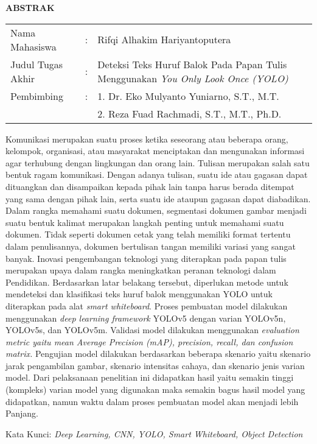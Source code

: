 \begin{center}
  \large\textbf{ABSTRAK}
\end{center}


\vspace{2ex}

\begingroup
  \setlength{\tabcolsep}{0pt}

  \noindent
  \begin{tabularx}{\textwidth}{l >{\centering}m{2em} X}
    Nama Mahasiswa    &:& Rifqi Alhakim Hariyantoputera \\

    Judul Tugas Akhir &:&	Deteksi Teks Huruf Balok Pada Papan Tulis Menggunakan \emph{You Only Look Once (YOLO)} \\

    Pembimbing        &:& 1. Dr. Eko Mulyanto Yuniarno, S.T., M.T. \\
                      & & 2. Reza Fuad Rachmadi, S.T., M.T., Ph.D. \\
  \end{tabularx}
\endgroup

Komunikasi merupakan suatu proses ketika seseorang atau beberapa orang, kelompok, organisasi, atau masyarakat menciptakan dan mengunakan informasi agar terhubung dengan lingkungan dan orang lain. Tulisan merupakan salah satu bentuk ragam komunikasi. Dengan adanya tulisan, suatu ide atau gagasan dapat dituangkan dan disampaikan kepada pihak lain tanpa harus berada ditempat yang sama dengan pihak lain, serta suatu ide ataupun gagasan dapat diabadikan. Dalam rangka memahami suatu dokumen, segmentasi dokumen gambar menjadi suatu bentuk kalimat merupakan langkah penting untuk memahami suatu dokumen. Tidak seperti dokumen cetak yang telah memiliki format tertentu dalam penulisannya, dokumen bertulisan tangan memiliki variasi yang sangat banyak. Inovasi pengembangan teknologi yang diterapkan pada papan tulis merupakan upaya dalam rangka meningkatkan peranan teknologi dalam Pendidikan. Berdasarkan latar belakang tersebut, diperlukan metode untuk mendeteksi dan klasifikasi teks huruf balok menggunakan YOLO untuk diterapkan pada alat \textit{smart whiteboard}. Proses pembuatan model dilakukan menggunakan \textit{deep learning framework} YOLOv5 dengan varian YOLOv5n, YOLOv5s, dan YOLOv5m. Validasi model dilakukan menggunakan \textit{evaluation metric \textnormal{yaitu} mean Average Precision (mAP), precision, recall, \textnormal{dan} confusion matrix.} Pengujian model dilakukan berdasarkan beberapa skenario yaitu skenario jarak pengambilan gambar, skenario intensitas cahaya, dan skenario jenis varian model. Dari pelaksanaan penelitian ini didapatkan hasil yaitu semakin tinggi (kompleks) varian model yang digunakan maka semakin bagus hasil model yang didapatkan, namun waktu dalam proses pembuatan model akan menjadi lebih Panjang.

Kata Kunci: \textit{Deep Learning, CNN, YOLO, Smart Whiteboard, Object Detection}

